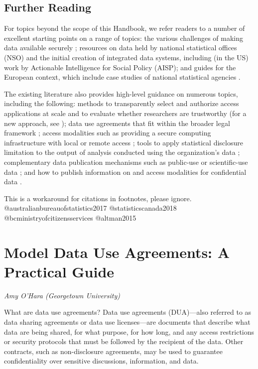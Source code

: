 \documentclass[
]{book}
\begin{document}
\hypertarget{further-reading}{%
\section{Further Reading}\label{further-reading}}

For topics beyond the scope of this Handbook, we refer readers to a number of excellent starting points on a range of topics: the various challenges of making data available securely \citep[see f.i.][]{reuter2010, harron2017, adrfnetwork2018, futureofprivacyforum2017}; resources on data held by national statistical offices (NSO) and the initial creation of integrated data systems, including (in the US) work by Actionable Intelligence for Social Policy (AISP); and guides for the European context, which include case studies of national statistical agencies \citep{oecd2014, bujnowska2019}.

The existing literature also provides high-level guidance on numerous topics, including the following: methods to transparently select and authorize access applications at scale and to evaluate whether researchers are trustworthy (for a new approach, see \citet{levenstein2018}); data use agreements that fit within the broader legal framework \citep[some limited guidance provided by][]{kanous2015, kuchinke2016, alter2018}; access modalities such as providing a secure computing infrastructure with local or remote access \citep{weinberg2007, vilhuber2013, vilhuber2017}; tools to apply statistical disclosure limitation to the output of analysis conducted using the organization's data \citep{liu2020, dupriez2010, duncan2011}; complementary data publication mechanisms such as public-use or scientific-use data \citep{bujnowska2019}; and how to publish information on and access modalities for confidential data \citep{abowd2012}.

\begin{invisible}
This is a workaround for citations in footnotes, please ignore.
@australianbureauofstatistics2017 @statisticscanada2018
@bcministryofcitizensservices @altman2015
\end{invisible}

\hypertarget{dua}{%
\chapter{Model Data Use Agreements: A Practical Guide}\label{dua}}

\emph{Amy O'Hara (Georgetown University)}

What are data use agreements? Data use agreements (DUA)---also referred to as data sharing agreements or data use licenses---are documents that describe what data are being shared, for what purpose, for how long, and any access restrictions or security protocols that must be followed by the recipient of the data. Other contracts, such as non-disclosure agreements, may be used to guarantee confidentiality over sensitive discussions, information, and data.
\end{document}
